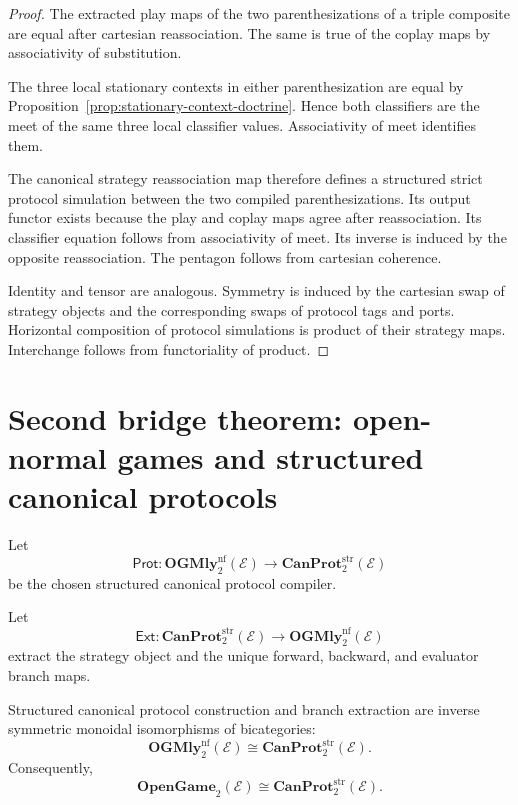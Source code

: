 \begin{proof}
The extracted play maps of the two parenthesizations of a triple composite are equal after cartesian
reassociation. The same is true of the coplay maps by associativity of substitution.

The three local stationary contexts in either parenthesization are equal by
Proposition~\ref{prop:stationary-context-doctrine}. Hence both classifiers are the meet of the same
three local classifier values. Associativity of meet identifies them.

The canonical strategy reassociation map therefore defines a structured strict protocol simulation
between the two compiled parenthesizations. Its output functor exists because the play and coplay
maps agree after reassociation. Its classifier equation follows from associativity of meet. Its
inverse is induced by the opposite reassociation. The pentagon follows from cartesian coherence.

Identity and tensor are analogous. Symmetry is induced by the cartesian swap of strategy objects and
the corresponding swaps of protocol tags and ports. Horizontal composition of protocol simulations
is product of their strategy maps. Interchange follows from functoriality of product.
\end{proof}

\section{Second bridge theorem: open-normal games and structured canonical protocols}
\label{sec:second-bridge-theorem}

Let
\[
  \mathsf{Prot}:
  \mathbf{OGMly}^{\mathrm{nf}}_2(\mathcal E)
  \longrightarrow
  \mathbf{CanProt}^{\mathrm{str}}_2(\mathcal E)
\]
be the chosen structured canonical protocol compiler.

Let
\[
  \mathsf{Ext}:
  \mathbf{CanProt}^{\mathrm{str}}_2(\mathcal E)
  \longrightarrow
  \mathbf{OGMly}^{\mathrm{nf}}_2(\mathcal E)
\]
extract the strategy object and the unique forward, backward, and evaluator branch maps.

\begin{theorem}
\label{thm:second-bridge}
Structured canonical protocol construction and branch extraction are inverse symmetric monoidal
isomorphisms of bicategories:
\[
  \boxed{
  \mathbf{OGMly}^{\mathrm{nf}}_2(\mathcal E)
  \cong
  \mathbf{CanProt}^{\mathrm{str}}_2(\mathcal E).
  }
\]
Consequently,
\[
  \boxed{
  \mathbf{OpenGame}_2(\mathcal E)
  \cong
  \mathbf{CanProt}^{\mathrm{str}}_2(\mathcal E).
  }
\]
\end{theorem}

